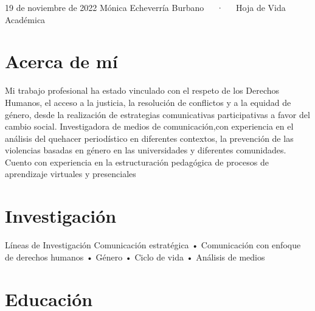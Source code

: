 \documentclass[11pt,a4paper,]{awesome-cv}
\begin{document}
\makecvheader

\makecvfooter
  {19 de noviembre de 2022}
    {Mónica Echeverría Burbano~~~·~~~Hoja de Vida Académica}
  {\thepage}





\hypertarget{acerca-de-muxed}{%
\section{Acerca de mí}\label{acerca-de-muxed}}

Mi trabajo profesional ha estado vinculado con el respeto de los
Derechos Humanos, el acceso a la justicia, la resolución de conflictos y
a la equidad de género, desde la realización de estrategias
comunicativas participativas a favor del cambio social. Investigadora de
medios de comunicación,con experiencia en el análisis del quehacer
periodístico en diferentes contextos, la prevención de las violencias
basadas en género en las universidades y diferentes comunidades. Cuento
con experiencia en la estructuración pedagógica de procesos de
aprendizaje virtuales y presenciales

\hypertarget{investigaciuxf3n}{%
\section{Investigación}\label{investigaciuxf3n}}

\begin{cvskills}
  \cvskill
    {Líneas de Investigación}
    {Comunicación estratégica • Comunicación con enfoque de derechos humanos • Género • Ciclo de vida • \newline
    Análisis de medios}
\end{cvskills}

\hypertarget{educaciuxf3n}{%
\section{Educación}\label{educaciuxf3n}}
\end{document}
